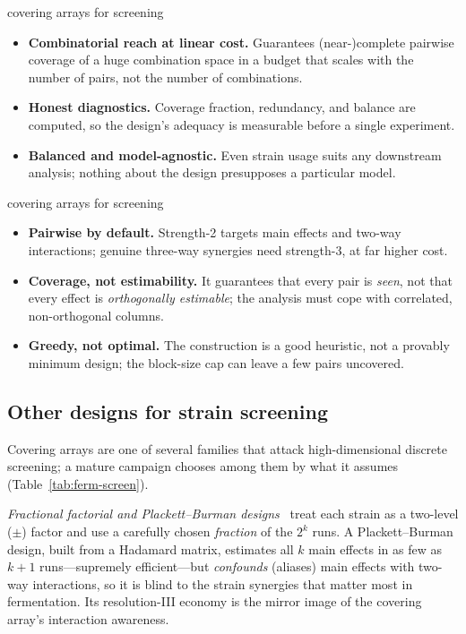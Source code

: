 \begin{prosbox}{covering arrays for screening}
\begin{itemize}
  \item \textbf{Combinatorial reach at linear cost.} Guarantees (near-)complete
  pairwise coverage of a huge combination space in a budget that scales with the
  number of pairs, not the number of combinations.
  \item \textbf{Honest diagnostics.} Coverage fraction, redundancy, and balance are
  computed, so the design's adequacy is measurable before a single experiment.
  \item \textbf{Balanced and model-agnostic.} Even strain usage suits any
  downstream analysis; nothing about the design presupposes a particular model.
\end{itemize}
\end{prosbox}

\begin{consbox}{covering arrays for screening}
\begin{itemize}
  \item \textbf{Pairwise by default.} Strength-2 targets main effects and two-way
  interactions; genuine three-way synergies need strength-3, at far higher cost.
  \item \textbf{Coverage, not estimability.} It guarantees that every pair is
  \emph{seen}, not that every effect is \emph{orthogonally estimable}; the analysis
  must cope with correlated, non-orthogonal columns.
  \item \textbf{Greedy, not optimal.} The construction is a good heuristic, not a
  provably minimum design; the block-size cap can leave a few pairs uncovered.
\end{itemize}
\end{consbox}

\subsection{Other designs for strain screening}

Covering arrays are one of several families that attack high-dimensional discrete
screening; a mature campaign chooses among them by what it assumes
(Table~\ref{tab:ferm-screen}).

\emph{Fractional factorial and Plackett--Burman designs}~\cite{schmidtbox,plackett}
treat each strain as a two-level ($\pm$) factor and use a carefully chosen
\emph{fraction} of the $2^k$ runs. A Plackett--Burman design, built from a Hadamard
matrix, estimates all $k$ main effects in as few as $k+1$ runs---supremely
efficient---but \emph{confounds} (aliases) main effects with two-way interactions,
so it is blind to the strain synergies that matter most in fermentation. Its
resolution-III economy is the mirror image of the covering array's interaction
awareness.

